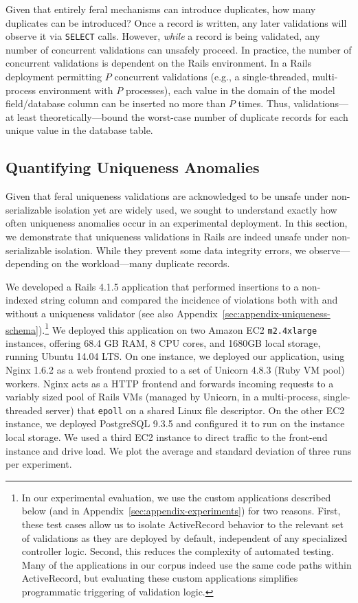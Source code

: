  Given that entirely feral
mechanisms can introduce duplicates, how many duplicates can be
introduced? Once a record is written, any later validations will
observe it via \texttt{SELECT} calls. However, \textit{while} a record
is being validated, any number of concurrent validations can
unsafely proceed. In practice, the number of concurrent validations
is dependent on the Rails environment. In a Rails deployment
permitting $P$ concurrent validations (e.g., a single-threaded,
multi-process environment with $P$ processes), each value in the
domain of the model field/database column can be inserted no more than
$P$ times. Thus, validations---at least theoretically---bound the
worst-case number of duplicate records for each unique value in the
database table.

\subsection{Quantifying Uniqueness Anomalies}

Given that feral uniqueness validations are acknowledged to be unsafe
under non-serializable isolation yet are widely used, we sought to
understand exactly how often uniqueness anomalies occur in an
experimental deployment. In this section, we demonstrate that
uniqueness validations in Rails are indeed unsafe under
non-serializable isolation. While they prevent some data integrity
errors, we observe---depending on the workload---many duplicate
records.

 We developed a Rails 4.1.5 application
that performed insertions to a non-indexed string column and compared
the incidence of violations both with and without a uniqueness
validator (see also
Appendix~\ref{sec:appendix-uniqueness-schema}).\footnote{In our
  experimental evaluation, we use the custom applications described
  below (and in Appendix~\ref{sec:appendix-experiments}) for two
  reasons. First, these test cases allow us to isolate ActiveRecord
  behavior to the relevant set of validations as they are deployed by
  default, independent of any specialized controller logic. Second,
  this reduces the complexity of automated testing. Many of the
  applications in our corpus indeed use the same code paths within
  ActiveRecord, but evaluating these custom applications simplifies
  programmatic triggering of validation logic.} We deployed this
application on two Amazon EC2 \texttt{m2.4xlarge} instances, offering
68.4 GB RAM, 8 CPU cores, and 1680GB local storage, running Ubuntu
14.04 LTS. On one instance, we deployed our application, using Nginx
1.6.2 as a web frontend proxied to a set of Unicorn 4.8.3 (Ruby VM
pool) workers. Nginx acts as a HTTP frontend and forwards incoming
requests to a variably sized pool of Rails VMs (managed by Unicorn, in
a multi-process, single-threaded server) that \texttt{epoll} on a
shared Linux file descriptor. On the other EC2 instance, we deployed
PostgreSQL 9.3.5 and configured it to run on the instance local
storage. We used a third EC2 instance to direct traffic to the
front-end instance and drive load. We plot the average and standard
deviation of three runs per experiment.

